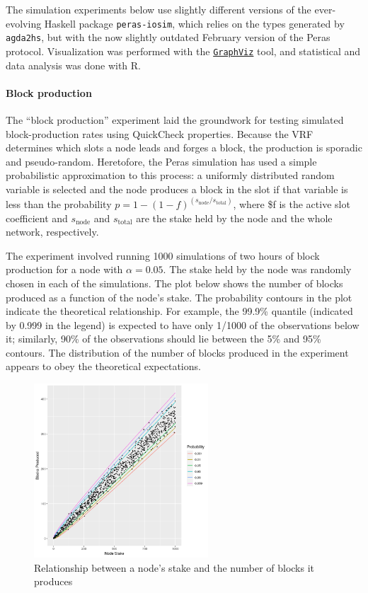 \documentclass[10pt]{article}
\begin{document}
The simulation experiments below use slightly different versions of the
ever-evolving Haskell package \texttt{peras-iosim}, which relies on the
types generated by \texttt{agda2hs}, but with the now slightly outdated
February version of the Peras protocol. Visualization was performed with
the \href{https://graphviz.org}{\color{blue}\texttt{GraphViz}} tool, and statistical and data
analysis was done with R.

\paragraph{Block production}\label{block-production}

The ``block production'' experiment laid the groundwork for testing
simulated block-production rates using QuickCheck properties. Because
the VRF determines which slots a node leads and forges a block, the
production is sporadic and pseudo-random. Heretofore, the Peras
simulation has used a simple probabilistic approximation to this
process: a uniformly distributed random variable is selected and the
node produces a block in the slot if that variable is less than the
probability \(p = 1 - (1 - f) ^ (s_\text{node} / s_\text{total})\),
where \$f is the active slot coefficient and \(s_\text{node}\) and
\(s_\text{total}\) are the stake held by the node and the whole network,
respectively.

The experiment involved running 1000 simulations of two hours of block
production for a node with \(\alpha = 0.05\). The stake held by the node
was randomly chosen in each of the simulations. The plot below shows the
number of blocks produced as a function of the node's stake. The
probability contours in the plot indicate the theoretical relationship.
For example, the 99.9\% quantile (indicated by 0.999 in the legend) is
expected to have only 1/1000 of the observations below it; similarly,
90\% of the observations should lie between the 5\% and 95\% contours.
The distribution of the number of blocks produced in the experiment
appears to obey the theoretical expectations.

\begin{figure}
\centering
\includegraphics[width=0.58\textwidth]{../diagrams/sim-expts/blockproduction-scatter.png}
\caption{Relationship between a node's stake and the number of blocks it
produces}
\end{figure}
\end{document}
